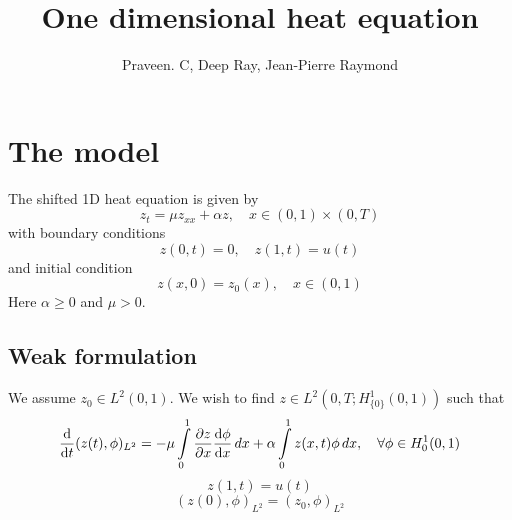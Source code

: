 \documentclass[12pt]{article}
\title{One dimensional heat equation}
\author{Praveen. C, Deep Ray, Jean-Pierre Raymond}
\begin{document}
\maketitle


\section{The model}
The shifted 1D heat equation is given by
\[
z_t = \mu z_{xx} + \alpha z, \quad x \in (0,1) \times (0,T)
\]
with boundary conditions
\[
z(0,t) = 0, \quad z(1,t) = u(t)
\]
and initial condition
\[
z(x,0) = z_0(x) , \quad x \in (0,1)
\]
Here $\alpha \ge 0$ and $\mu > 0$. 

\subsection{Weak formulation}
We assume $z_0 \in L^2(0,1)$. We wish to find $z \in L^2(0,T;H^1_{\{0\}}(0,1))$ such that
\[
 \frac{\textrm{d} }{\textrm{d} t}(z(t), \phi)_{L^2} = - \mu \int \limits^{1}_{0} \frac{\partial z}{\partial x} \frac{\textrm{d} \phi}{\textrm{d} x} \, dx +  \alpha \int \limits^{1}_{0} z(x,t) \phi \, dx, \quad \forall \phi \in H^1_0(0,1)
\]
\[
 z(1,t) = u(t)
\]
\[
 (z(0),\phi)_{L^2} = (z_0 ,\phi)_{L^2}
\]
\end{document}
